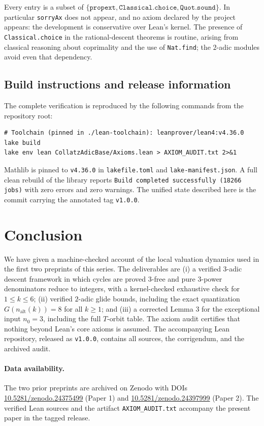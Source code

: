 \documentclass[11pt,a4paper]{article}
\begin{document}
\noindent Every entry is a subset of $\{\texttt{propext},\texttt{Classical.choice},
\texttt{Quot.sound}\}$.  In particular \texttt{sorryAx} does not appear, and no
axiom declared by the project appears: the development is conservative over
Lean's kernel.  The presence of \texttt{Classical.choice} in the rational-descent
theorems is routine, arising from classical reasoning about coprimality and the
use of \texttt{Nat.find}; the $2$-adic modules avoid even that dependency.

\subsection{Build instructions and release information}

The complete verification is reproduced by the following commands from the
repository root:

\begin{lstlisting}
# Toolchain (pinned in ./lean-toolchain): leanprover/lean4:v4.36.0
lake build
lake env lean CollatzAdicBase/Axioms.lean > AXIOM_AUDIT.txt 2>&1
\end{lstlisting}

\noindent Mathlib is pinned to \texttt{v4.36.0} in \texttt{lakefile.toml} and
\texttt{lake-manifest.json}.  A full clean rebuild of the library reports
\texttt{Build completed successfully (18266 jobs)} with zero errors and zero
warnings.  The unified state described here is the commit carrying the
annotated tag \texttt{v1.0.0}.

\section{Conclusion}

We have given a machine-checked account of the local valuation dynamics used in
the first two preprints of this series.  The deliverables are (i) a verified
$3$-adic descent framework in which cycles are proved $3$-free and pure
$3$-power denominators reduce to integers, with a kernel-checked exhaustive
check for $1\le k\le 6$; (ii) verified $2$-adic glide bounds, including the
exact quantization $G(n_{\mathrm{alt}}(k))=8$ for all $k\ge 1$; and (iii) a
corrected Lemma 3 for the exceptional input $n_{0}=3$, including the full
$T$-orbit table.  The axiom audit certifies that nothing beyond Lean's core
axioms is assumed.  The accompanying Lean repository, released as \texttt{v1.0.0},
contains all sources, the corrigendum, and the archived audit.

\paragraph{Data availability.}
The two prior preprints are archived on Zenodo with DOIs
\href{https://doi.org/10.5281/zenodo.24375499}{10.5281/zenodo.24375499}
(Paper 1) and
\href{https://doi.org/10.5281/zenodo.24397999}{10.5281/zenodo.24397999}
(Paper 2).  The verified Lean sources and the artifact
\texttt{AXIOM\_AUDIT.txt} accompany the present paper in the tagged release.
\end{document}
